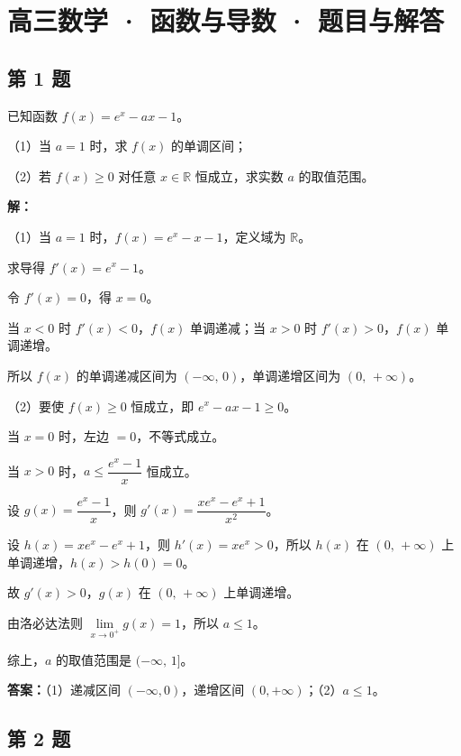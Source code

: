 \documentclass[
]{ctexart}
\author{}
\date{}
\begin{document}
\section{高三数学 · 函数与导数 ·
题目与解答}\thispagestyle{plain}\label{ux9ad8ux4e09ux6570ux5b66-ux51fdux6570ux4e0eux5bfcux6570-ux9898ux76eeux4e0eux89e3ux7b54}

\subsection{第 1 题}\label{ux7b2c-1-ux9898}

已知函数 \(f(x)=e^{x}-ax-1\)。

（1）当 \(a=1\) 时，求 \(f(x)\) 的单调区间；

（2）若 \(f(x)\ge 0\) 对任意 \(x\in\mathbb{R}\) 恒成立，求实数 \(a\)
的取值范围。

\textbf{解：}

（1）当 \(a=1\) 时，\(f(x)=e^{x}-x-1\)，定义域为 \(\mathbb{R}\)。

求导得 \(f'(x)=e^{x}-1\)。

令 \(f'(x)=0\)，得 \(x=0\)。

当 \(x<0\) 时 \(f'(x)<0\)，\(f(x)\) 单调递减；当 \(x>0\) 时
\(f'(x)>0\)，\(f(x)\) 单调递增。

所以 \(f(x)\) 的单调递减区间为 \((-\infty,\,0)\)，单调递增区间为
\((0,\,+\infty)\)。

（2）要使 \(f(x)\ge 0\) 恒成立，即 \(e^{x}-ax-1\ge 0\)。

当 \(x=0\) 时，左边 \(=0\)，不等式成立。

当 \(x>0\) 时，\(a\le\dfrac{e^{x}-1}{x}\) 恒成立。

设 \(g(x)=\dfrac{e^{x}-1}{x}\)，则
\(g'(x)=\dfrac{xe^{x}-e^{x}+1}{x^{2}}\)。

设 \(h(x)=xe^{x}-e^{x}+1\)，则 \(h'(x)=xe^{x}>0\)，所以 \(h(x)\) 在
\((0,\,+\infty)\) 上单调递增，\(h(x)>h(0)=0\)。

故 \(g'(x)>0\)，\(g(x)\) 在 \((0,\,+\infty)\) 上单调递增。

由洛必达法则 \(\lim\limits_{x\to 0^{+}}g(x)=1\)，所以 \(a\le 1\)。

综上，\(a\) 的取值范围是 \((-\infty,\,1]\)。

\textbf{答案：}（1）递减区间 \((-\infty,0)\)，递增区间
\((0,+\infty)\)；（2）\(a\le 1\)。

\subsection{第 2 题}\label{ux7b2c-2-ux9898}
\end{document}
